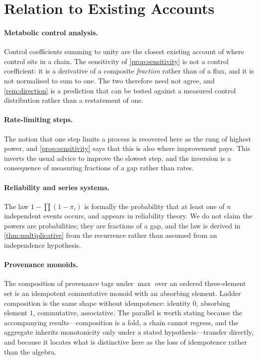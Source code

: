 \documentclass[11pt,twocolumn,a4paper]{article}
\theoremstyle{plain}
\theoremstyle{definition}
\theoremstyle{remark}
\newcommand{\pow}{\pi}
\begin{document}
\section{Relation to Existing Accounts}
\label{sec:relation}

\paragraph{Metabolic control analysis.} Control coefficients summing to unity
are the closest existing account of where control sits in a chain. The
sensitivity of \cref{prop:sensitivity} is not a control coefficient: it is a
derivative of a composite \emph{fraction} rather than of a flux, and it is not
normalised to sum to one. The two therefore need not agree, and
\cref{rem:direction} is a prediction that can be tested against a measured
control distribution rather than a restatement of one.

\paragraph{Rate-limiting steps.} The notion that one step limits a process is
recovered here as the rung of highest power, and \cref{prop:sensitivity} says
that this is also where improvement pays. This inverts the usual advice to
improve the slowest step, and the inversion is a consequence of measuring
fractions of a gap rather than rates.

\paragraph{Reliability and series systems.} The law $1-\prod(1-\pow_i)$ is
formally the probability that at least one of $n$ independent events occurs,
and appears in reliability theory. We do not claim the powers are
probabilities; they are fractions of a gap, and the law is derived in
\cref{thm:multiplicative} from the recurrence rather than assumed from an
independence hypothesis.

\paragraph{Provenance monoids.} The composition of provenance tags under
$\max$ over an ordered three-element set is an idempotent commutative monoid
with an absorbing element. Ladder composition is the same shape without
idempotence: identity $0$, absorbing element $1$, commutative, associative.
The parallel is worth stating because the accompanying results---composition
is a fold, a chain cannot regress, and the aggregate inherits monotonicity only
under a stated hypothesis---transfer directly, and because it locates what is
distinctive here as the loss of idempotence rather than the algebra.
\end{document}
